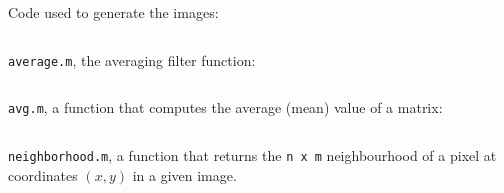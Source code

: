 Code used to generate the images:
\inputminted[linenos=true]{octave}{../code/2.1.m}

\texttt{average.m}, the averaging filter function:
\inputminted[linenos=true]{octave}{../code/avgfilter.m}

\texttt{avg.m}, a function that computes the average (mean) value of a matrix:
\inputminted[linenos=true]{octave}{../code/avg.m}

\texttt{neighborhood.m}, a function that returns the \texttt{n x m} neighbourhood of a pixel at coordinates $(x,y)$ in a given image.
\inputminted[linenos=true]{octave}{../code/neighborhood.m}
